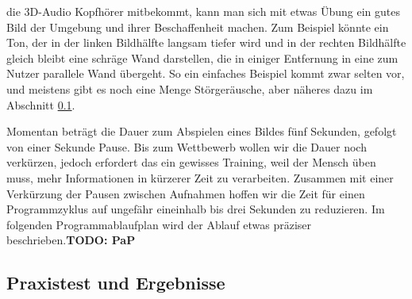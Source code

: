 \documentclass[a4paper,12pt,ngerman]{scrartcl}
\begin{document}
die 3D-Audio Kopfhörer mitbekommt, kann man sich mit etwas Übung ein gutes Bild der Umgebung und ihrer
Beschaffenheit machen. Zum Beispiel könnte ein Ton, der in der linken Bildhälfte langsam tiefer wird und 
in der rechten Bildhälfte gleich bleibt eine schräge Wand darstellen, die in einiger Entfernung in eine
zum Nutzer parallele Wand übergeht. So ein einfaches Beispiel kommt zwar selten vor, und meistens gibt es
noch eine Menge Störgeräusche, aber näheres dazu im Abschnitt \ref{testsAndResults}.\par 
Momentan beträgt die Dauer zum Abspielen eines Bildes fünf Sekunden, gefolgt von einer Sekunde 
Pause. Bis zum Wettbewerb wollen wir die Dauer noch verkürzen, jedoch erfordert das ein gewisses 
Training, weil der Mensch üben muss, mehr Informationen in kürzerer Zeit zu verarbeiten. Zusammen mit 
einer Verkürzung der Pausen zwischen Aufnahmen hoffen wir die Zeit für einen Programmzyklus auf ungefähr
eineinhalb bis drei Sekunden zu reduzieren. Im folgenden Programmablaufplan wird der Ablauf etwas 
präziser beschrieben.\textbf{TODO: PaP} \newline

\subsection{Praxistest und Ergebnisse} \label{testsAndResults}
\end{document}
